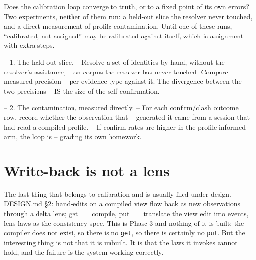 \begin{Open}{Does the calibration loop converge to truth, or to a fixed point of its own errors?}{Two experiments, neither of them run: a held-out slice the resolver never touched, and a direct measurement of profile contamination.}
Until one of these runs, ``calibrated, not assigned'' may be calibrated against itself, which is assignment with extra steps.

\begin{Check}
-- 1. The held-out slice.
--    Resolve a set of identities by hand, without the resolver's assistance,
--    on corpus the resolver has never touched. Compare measured precision
--    per evidence type against it. The divergence between the two precisions
--    IS the size of the self-confirmation.

-- 2. The contamination, measured directly.
--    For each confirm/clash outcome row, record whether the observation that
--    generated it came from a session that had read a compiled profile.
--    If confirm rates are higher in the profile-informed arm, the loop is
--    grading its own homework.
\end{Check}
\end{Open}

\section{Write-back is not a lens}

The last thing that belongs to calibration and is usually filed under design. \textsf{DESIGN.md} \S2: hand-edits on a compiled view flow back as new observations through a delta lens; get $=$ compile, put $=$ translate the view edit into events, lens laws as the consistency spec. This is Phase 3 and nothing of it is built: the compiler does not exist, so there is no \texttt{get}, so there is certainly no \texttt{put}. But the interesting thing is not that it is unbuilt. It is that the laws it invokes cannot hold, and the failure is the system working correctly.

